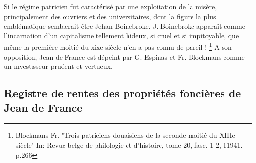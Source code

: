 Si le régime patricien fut caractérisé par une exploitation de la misère, principalement des ouvriers et des universitaires, dont la figure la plus emblématique semblerait être Jehan Boinebroke. 
\quote 
    \og J. Boinebroke apparaît comme l'incarnation d'un capitalisme tellement hideux, si cruel et si impitoyable, que même la première moitié du xixe siècle n'en a pas connu de pareil ! \fg{} 
    \footnote{ Blockmans Fr. "Trois patriciens douaisiens de la seconde moitié du XIIIe siècle" In: Revue belge de philologie et d'histoire, tome 20, fasc. 1-2, 11941. p.266} 
\endquote
\vspace{0,5cm}
A son opposition, Jean de France est dépeint par G. Espinas et Fr. Blockmans comme un investisseur prudent et vertueux.
\subsection{Registre de rentes des propriétés foncières de Jean de France}

